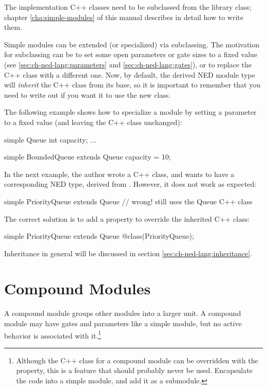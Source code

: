 The implementation C++ classes need to be subclassed from the
 library class; chapter \ref{cha:simple-modules} of
this manual describes in detail how to write them.

Simple modules can be extended (or specialized) via subclassing. The
motivation for subclassing can be to set some open parameters or gate sizes
to a fixed value (see \ref{sec:ch-ned-lang:parameters} and
\ref{sec:ch-ned-lang:gates}), or to replace the C++ class with a different
one. Now, by default, the derived NED module type will \textit{inherit} the
C++ class from its base, so it is important to remember that you need to
write out  if you want it to use the new class.

The following example shows how to specialize a module by setting a parameter
to a fixed value (and leaving the C++ class unchanged):

\begin{ned}
simple Queue
{
   int capacity;
   ...
}

simple BoundedQueue extends Queue
{
   capacity = 10;
}
\end{ned}

In the next example, the author wrote a  C++ class, and
wants to have a corresponding NED type, derived from . However,
it does not work as expected:

\begin{ned}
simple PriorityQueue extends Queue // wrong! still uses the Queue C++ class
{
}
\end{ned}

The correct solution is to add a  property to override the
inherited C++ class:

\begin{ned}
simple PriorityQueue extends Queue
{
   @class(PriorityQueue);
}
\end{ned}

Inheritance in general will be discussed in section \ref{sec:ch-ned-lang:inheritance}.



\section{Compound Modules}
\label{sec:ch-ned-lang:compound-modules}

A compound module groups other modules into a larger unit. A compound
module may have gates and parameters like a simple module, but no active
behavior is associated with it.\footnote{Although the C++ class
for a compound module can be overridden with the  property,
this is a feature that should probably never be used. Encapsulate the code
into a simple module, and add it as a submodule.}


